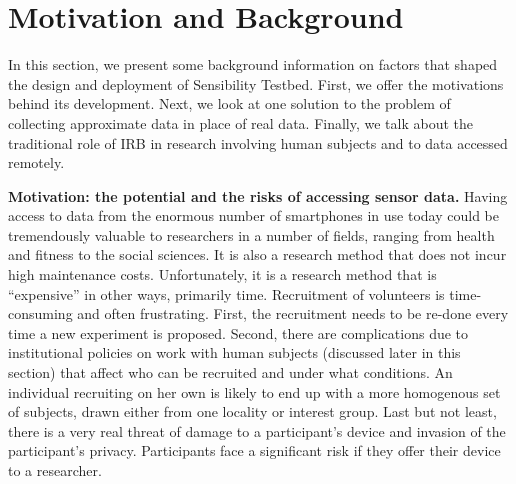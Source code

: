 \section{Motivation and Background}\label{sec-motivation}

In this section, we present some background information on 
factors that shaped the design and deployment of 
Sensibility Testbed. First, we offer the motivations behind its 
development. 
Next, we look at one solution to the problem of collecting approximate 
data in place of real data. Finally, we talk about 
the traditional role of IRB in research involving human subjects 
and to data accessed remotely. 

\textbf{Motivation: the potential and the risks of accessing sensor data.}
Having access to data from the enormous number of smartphones 
in use today could be tremendously valuable to researchers in a 
number of fields, ranging from health and fitness to the social sciences. 
It is also a research method that does not incur high maintenance costs. 
Unfortunately, it is a research method that is ``expensive'' in other ways, 
primarily time. Recruitment of volunteers is time-consuming and often 
frustrating. %
First, %
the recruitment needs to be re-done every time a new experiment is proposed. 
Second, there are complications due to institutional policies on work 
with human subjects (discussed later in this section) that affect who 
can be recruited and under what conditions. An individual recruiting 
on her own is likely to end up with a more homogenous set of subjects, 
drawn either from one locality or interest group. Last but not least, there 
is a very real threat of damage to a participant's device and invasion 
of the participant's privacy. Participants face a significant risk if 
they offer their device to a researcher.


